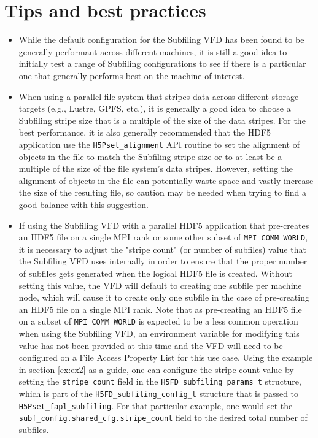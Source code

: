 \documentclass[../main.tex]{subfiles}
\begin{document}
\newpage

\section{Tips and best practices}
\label{sec:tips}

\begin{itemize}
\item While the default configuration for the Subfiling VFD has been found
to be generally performant across different machines, it is still a good
idea to initially test a range of Subfiling configurations to see if there
is a particular one that generally performs best on the machine of interest.

\item When using a parallel file system that stripes data across different
storage targets (e.g., Lustre, GPFS, etc.), it is generally a good idea to
choose a Subfiling stripe size that is a multiple of the size of the data
stripes. For the best performance, it is also generally recommended that
the HDF5 application use the \texttt{H5Pset\_alignment} API routine to set
the alignment of objects in the file to match the Subfiling stripe size or
to at least be a multiple of the size of the file system's data stripes.
However, setting the alignment of objects in the file can potentially waste
space and vastly increase the size of the resulting file, so caution may be
needed when trying to find a good balance with this suggestion.

\item If using the Subfiling VFD with a parallel HDF5 application that
pre-creates an HDF5 file on a single MPI rank or some other subset of
\texttt{MPI\_COMM\_WORLD}, it is necessary to adjust the "stripe count" (or
number of subfiles) value that the Subfiling VFD uses internally in order to
ensure that the proper number of subfiles gets generated when the logical HDF5
file is created. Without setting this value, the VFD will default to creating
one subfile per machine node, which will cause it to create only one subfile
in the case of pre-creating an HDF5 file on a single MPI rank. Note that as
pre-creating an HDF5 file on a subset of \texttt{MPI\_COMM\_WORLD} is expected
to be a less common operation when using the Subfiling VFD, an environment
variable for modifying this value has not been provided at this time and the
VFD will need to be configured on a File Access Property List for this use case.
Using the example in section \ref{ex:ex2} as a guide, one can configure the
stripe count value by setting the \texttt{stripe\_count} field in the
\texttt{H5FD\_subfiling\_params\_t} structure, which is part of the
\texttt{H5FD\_subfiling\_config\_t} structure that is passed to 
\texttt{H5Pset\_fapl\_subfiling}. For that particular example, one would
set the \texttt{subf\_config.shared\_cfg.stripe\_count} field to the desired
total number of subfiles.


\end{itemize}
\end{document}

